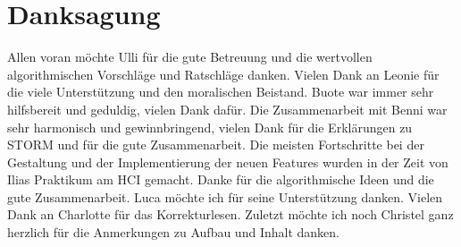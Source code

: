 \newpage
\thispagestyle{empty}
\section*{Danksagung}
Allen voran m\"ochte Ulli f\"ur die gute Betreuung und die wertvollen algorithmischen Vorschl\"age und Ratschl\"age danken.\newline
Vielen Dank an Leonie f\"ur die viele Unterst\"utzung und den moralischen Beistand.\newline
Buote war immer sehr hilfsbereit und geduldig, vielen Dank daf\"ur.\newline
Die Zusammenarbeit mit Benni war sehr harmonisch und gewinnbringend, vielen Dank f\"ur die Erkl\"arungen zu STORM und f\"ur die gute Zusammenarbeit.\newline
Die meisten Fortschritte bei der Gestaltung und der Implementierung der neuen Features wurden in der Zeit von Ilias Praktikum am HCI gemacht. Danke f\"ur die algorithmische Ideen und die gute Zusammenarbeit.\newline
Luca m\"ochte ich f\"ur seine Unterst\"utzung danken.\newline
Vielen Dank an Charlotte f\"ur das Korrekturlesen.\newline
Zuletzt m\"ochte ich noch Christel ganz herzlich f\"ur die Anmerkungen zu Aufbau und Inhalt danken.
